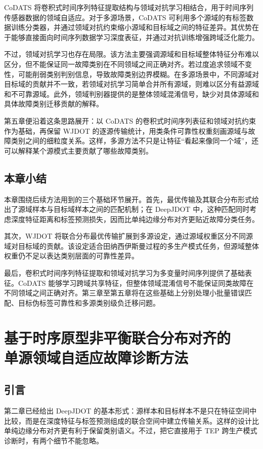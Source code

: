 \documentclass{seuthesis-2022}
\begin{document}
CoDATS 将卷积式时间序列特征提取结构与领域对抗学习相结合，用于时间序列传感器数据的领域自适应。对于多源场景，CoDATS 可利用多个源域的有标签数据训练分类器，并通过领域对抗约束缩小源域和目标域之间的特征差异。其优势在于能够直接面向时间序列数据学习深度表征，并通过对抗训练增强跨域泛化能力。

不过，领域对抗学习也存在局限。该方法主要强调源域和目标域整体特征分布难以区分，但不能保证同一故障类别在不同领域之间正确对齐。若过度追求领域不变性，可能削弱类别判别信息，导致故障类别边界模糊。在多源场景中，不同源域对目标域的贡献并不一致，若领域对抗学习简单合并所有源域，则难以区分有益源域和不可靠源域。此外，领域判别器提供的是整体领域混淆信号，缺少对具体源域和具体故障类别迁移贡献的解释。

第五章便沿着这条思路展开：以 CoDATS 的卷积式时间序列表征和领域对抗约束作为基础，再保留 WJDOT 的逐源传输统计，用类条件可靠性权重刻画源域与故障类别之间的细粒度关系。这样，多源方法不只是让特征“看起来像同一个域”，还可以解释某个源模式主要贡献了哪些故障类别。


\section{本章小结}

本章围绕后续方法用到的三个基础环节展开。首先，最优传输及其联合分布形式给出了源域样本与目标域样本之间的匹配机制；在 DeepJDOT 中，这种匹配同时考虑深度特征距离和标签预测损失，因而比单纯边缘分布对齐更贴近故障分类任务。

其次，WJDOT 将联合分布最优传输扩展到多源设定，通过源域权重区分不同源域对目标域的贡献。该设定适合田纳西伊斯曼过程的多生产模式任务，但源域整体权重仍不足以表达类别层面的可靠性差异。

最后，卷积式时间序列特征提取和领域对抗学习为多变量时间序列提供了基础表征。CoDATS 能够学习跨域共享特征，但整体领域混淆信号不能保证同类故障在不同领域之间正确对齐。第三章至第五章将在这些基础上分别处理小批量错误匹配、目标伪标签可靠性和多源类别级负迁移问题。
\chapter[基于时序原型非平衡联合分布对齐的单源领域自适应故障诊断方法]{基于时序原型非平衡联合分布对齐的\\单源领域自适应故障诊断方法}
\section{引言}

第二章已经给出 DeepJDOT 的基本形式：源样本和目标样本不是只在特征空间中比较，而是在深度特征与标签预测组成的联合空间中建立传输关系。这样的设计比单纯边缘分布对齐更有利于保留类别语义\cite{courty2017jdot,damodaran2018deepjdot}。不过，把它直接用于 TEP 跨生产模式诊断时，有两个细节不能忽略。
\end{document}
